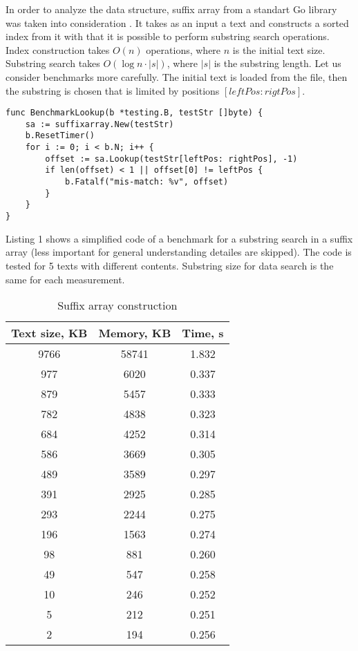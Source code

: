 
In order to analyze the data structure, suffix array from a standart Go library
was taken into consideration \cite{golang2016sa}. It takes as an input
a text and constructs a sorted index from it with that it is possible to perform
substring search operations. Index construction takes $O(n)$ operations, where $n$ is
the initial text size. Substring search takes $O(\log n \cdot |s|)$, where $|s|$ is the substring length.
Let us consider benchmarks more carefully. The initial text is loaded from the file,
then the substring is chosen that is limited by positions $[leftPos:rigtPos]$.

\begin{lstlisting}[caption=Suffix array example]
func BenchmarkLookup(b *testing.B, testStr []byte) {
    sa := suffixarray.New(testStr)
    b.ResetTimer()
    for i := 0; i < b.N; i++ {
        offset := sa.Lookup(testStr[leftPos: rightPos], -1)
        if len(offset) < 1 || offset[0] != leftPos {
            b.Fatalf("mis-match: %v", offset)
        }
    }
}
\end{lstlisting}

Listing 1 shows a simplified code of a benchmark for a substring search in a suffix array
(less important for general understanding detailes are skipped). The code is tested for 5 texts with
different contents. Substring size for data search is the same for each measurement.

\begin{table}[h!]
    \centering
    \begin{tabular}{|c|c|c|}
        \hline
        Text size, KB & Memory, KB & Time, s\\
        \hline
        9766 & 58741 & 1.832\\
        \hline
        977 & 6020 & 0.337\\
        \hline
        879 & 5457 & 0.333\\
        \hline
        782 & 4838 & 0.323\\
        \hline
        684 & 4252 & 0.314\\
        \hline
        586 & 3669 & 0.305\\
        \hline
        489 & 3589 & 0.297\\
        \hline
        391 & 2925 & 0.285\\
        \hline
        293 & 2244 & 0.275\\
        \hline
        196 & 1563 & 0.274\\
        \hline
        98 & 881 & 0.260\\
        \hline
        49 & 547 & 0.258\\
        \hline
        10 & 246 & 0.252\\
        \hline
        5 & 212 & 0.251\\
        \hline
        2 & 194 & 0.256\\
        \hline
    \end{tabular}
    \caption{Suffix array construction}
    \label{table:2}
\end{table}

